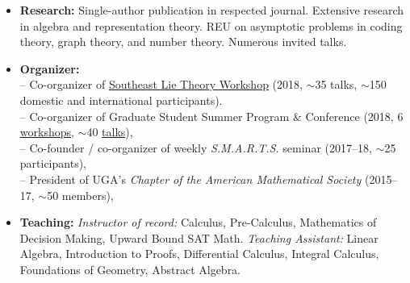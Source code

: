 \documentclass[10pt,a4paper]{article}
\begin{document}
{%


\spacedhrule{0.5em}{-0.4em}

\begin{itemize}
\item \textbf{Research:} Single-author publication in respected journal. Extensive research in algebra and representation theory. REU on asymptotic problems in coding theory, graph theory, and number theory. Numerous invited talks.
\item \textbf{Organizer:}
  \\ \null \hspace{0.2em} -- Co-organizer of \href{https://www.math.lsu.edu/~pramod/selie/10/}{Southeast Lie Theory Workshop} (2018, $\sim$35 talks, $\sim$150 domestic and international participants).
  \\ \null \hspace{0.2em} -- Co-organizer of Graduate Student Summer Program \& Conference (2018, 6 \href{https://research.franklin.uga.edu/agant/professional-development-summer-2018}{workshops}, $\sim$40 \href{https://research.franklin.uga.edu/agant/mock-ams-conference-2018}{talks}),
  \\ \null \hspace{0.2em} -- Co-founder / co-organizer of weekly \emph{S.M.A.R.T.S.} seminar (2017--18, $\sim$25 participants),
  \\ \null \hspace{0.2em} -- President of UGA's \emph{Chapter of the American Mathematical Society} (2015--17, $\sim$50 members),
\item \textbf{Teaching:} \emph{Instructor of record:} Calculus, Pre-Calculus, Mathematics of Decision Making, Upward Bound SAT Math. \emph{Teaching Assistant:} Linear Algebra, Introduction to Proofs, Differential Calculus, Integral Calculus, Foundations of Geometry, Abstract Algebra.

\end{itemize}}
\end{document}
